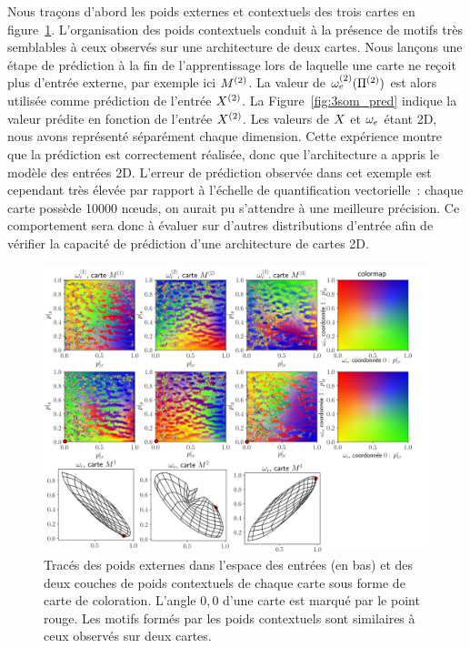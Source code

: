 \documentclass[../main]{subfiles}
\begin{document}
Nous traçons d'abord les poids externes et contextuels des trois cartes en figure~\ref{fig:3som_w}.
L'organisation des poids contextuels conduit à la présence de motifs très semblables à ceux observés sur une architecture de deux cartes.
Nous lançons une étape de prédiction à la fin de l'apprentissage lors de laquelle une carte ne reçoit plus d'entrée externe, par exemple ici $M^{({2})}$.
La valeur de $\omega_{e}^{({2})}(\Pi^{({2})})$ est alors utilisée comme prédiction de l'entrée $X^{({2})}$.
La Figure~\ref{fig:3som_pred} indique la valeur prédite en fonction de l'entrée $X^{({2})}$. 
Les valeurs de $X$ et $\omega_e$ étant 2D, nous avons représenté séparément chaque dimension. Cette expérience montre que la prédiction est correctement réalisée, donc que l'architecture a appris le modèle des entrées 2D. 
L'erreur de prédiction observée dans cet exemple est cependant très élevée par rapport à l'échelle de quantification vectorielle~: chaque carte possède 10000 n\oe{}uds, on aurait pu s'attendre à une meilleure précision.
Ce comportement sera donc à évaluer sur d'autres distributions d'entrée afin de vérifier la capacité de prédiction d'une architecture de cartes 2D.

\begin{figure}
		\includegraphics[width=\textwidth]{3SOM_S_wc_239999.png}
		\caption{Tracés des poids externes dans l'espace des entrées (en bas) et des deux couches de poids contextuels de chaque carte sous forme de carte de coloration. L'angle $0,0$ d'une carte est marqué par le point rouge. Les motifs formés par les poids contextuels sont similaires à ceux observés sur deux cartes. \label{fig:3som_w}}
\end{figure}
\end{document}
